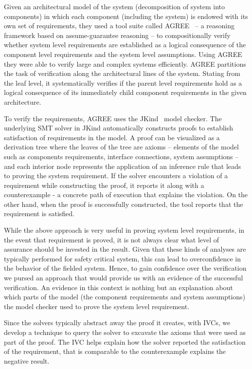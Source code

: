 Given an architectural model of the system (decomposition of system into components) in which each component (including the system) is endowed with its own set of requirements,
 they used a tool suite called AGREE~\cite{NFM2012:CoGaMiWhLaLu} -- a reasoning framework based on assume-guarantee reasoning -- to compositionally verify whether system level requirements are established as a logical consequence of the component level requirements and the system level assumptions.
 Using AGREE they were able to verify large and complex systems efficiently. AGREE partitions the task of verification along the architectural lines of the system. Stating from the leaf level, it systematically verifies if the parent level requirements hold as a logical consequence of its immediately child component requirements in the given architecture.

To verify the requirements, AGREE uses the JKind~\cite{jkind} model checker. The underlying SMT solver in JKind automatically constructs proofs to establish satisfaction of requirements in the model. A proof can be visualized as a derivation tree where the leaves of the tree are axioms -- elements of the model such as components requirements, interface connections, system assumptions -- and each interior node represents the application of an inference rule that leads to proving the system requirement. If the solver encounters a violation of a requirement while constructing the proof, it reports it along with a counterexample - a concrete path of execution that explains the violation. On the other hand, when the proof is successfully constructed, the tool reports that the requirement is satisfied.

While the above approach is very useful in proving system level requirements, in the event
that requirement is proved, it is not always clear what level of assurance should be invested in the
result.  Given that these kinds of analyses are typically performed for safety critical system, this
can lead to overconfidence in the behavior of the fielded system.
Hence, to gain confidence over the verification we pursed an approach that would provide
us with an evidence of the successful verification. An evidence in this context is nothing but an
explanation about which parts of the model (the component requirements and system assumptions) the
model checker used to prove the system level requirement.

Since the solvers typically abstract away the proof it creates, with IVCs, we develop a technique to query the solver to excavate the axioms that were used as part of the proof. The IVC helps explain how the solver reported the satisfaction of the requirement, that is comparable to the counterexample explains the negative result.



